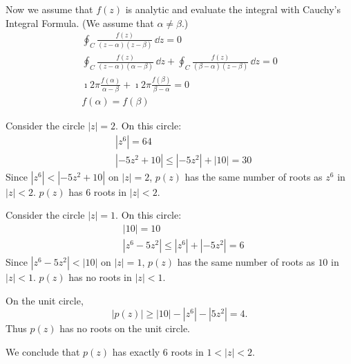 {\begin{Solution}
  Now we assume that $f(z)$ is analytic and evaluate the integral with Cauchy's
  Integral Formula.  (We assume that $\alpha \neq \beta$.)
  \begin{gather*}
    \oint_C \frac{f(z)}{(z - \alpha) (z - \beta)}\,\dd z = 0 
    \\
    \oint_C \frac{f(z)}{(z - \alpha) (\alpha - \beta)}\,\dd z 
    + \oint_C \frac{f(z)}{(\beta - \alpha) (z - \beta)}\,\dd z = 0 
    \\
    \imath 2 \pi \frac{f(\alpha)}{\alpha - \beta} + \imath 2 \pi \frac{f(\beta)}{\beta - \alpha} = 0 
    \\
    f(\alpha) = f(\beta)
  \end{gather*}
\end{Solution}








\begin{Solution}
  Consider the circle $|z| = 2$.  On this circle:
  \begin{align*}
    &|z^6| = 64 
    \\
    &|- 5 z^2 + 10| \leq |- 5 z^2| + |10| = 30
  \end{align*}
  Since $|z^6| < |- 5 z^2 + 10|$ on $|z| = 2$, $p(z)$ has the same number
  of roots as $z^6$ in $|z| < 2$.  $p(z)$ has 6 roots in $|z| < 2$.

  Consider the circle $|z| = 1$.  On this circle:
  \begin{align*}
    &|10| = 10 
    \\
    &|z^6 - 5 z^2| \leq |z^6| + |- 5 z^2| = 6
  \end{align*}
  Since $|z^6 - 5 z^2| < |10|$ on $|z| = 1$, $p(z)$ has the same number
  of roots as $10$ in $|z| < 1$.  $p(z)$ has no roots in $|z| < 1$.

  On the unit circle, 
  \[
  |p(z)| \geq |10| - |z^6| - |5 z^2| = 4.
  \]
  Thus $p(z)$ has no roots on the unit circle.

  We conclude that $p(z)$ has exactly 6 roots in $1 < |z| < 2$.
\end{Solution}














}
